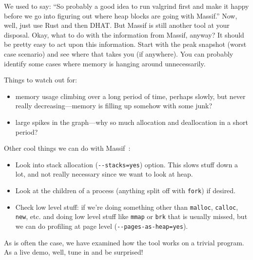 \documentclass[a4paper]{report}
\begin{document}
We used to say: ``So probably a good idea to run valgrind first and make it happy before we go into figuring out where heap blocks are going with Massif.'' Now, well, just use Rust and then DHAT. But Massif is still another tool at your disposal. Okay, what to do with the information from Massif, anyway? It should be pretty easy to act upon this information. Start with the peak snapshot (worst case scenario) and see where that takes you (if anywhere). You can probably identify some cases where memory is hanging around unnecessarily. 

Things to watch out for:
\begin{itemize}
\item memory usage climbing over a long period of time, perhaps slowly, but never really decreasing---memory is filling up somehow with some junk? 
\item large spikes in the graph---why so much allocation and deallocation in a short period?
\end{itemize}

Other cool things we can do with Massif~\cite{massif}:

\begin{itemize}
	\item Look into stack allocation (\verb+--stacks=yes+) option. This slows stuff down a lot, and not really necessary since we want to look at heap.
	\item Look at the children of a process (anything split off with \texttt{fork}) if desired.
	\item Check low level stuff: if we're doing something other than \texttt{malloc}, \texttt{calloc}, \texttt{new}, etc. and doing low level stuff like \texttt{mmap} or \texttt{brk} that is usually missed, but we can do profiling at page level (\verb+--pages-as-heap=yes+).
\end{itemize}

As is often the case, we have examined how the tool works on a trivial program. As a live demo, well, tune in and be surprised!
\end{document}
